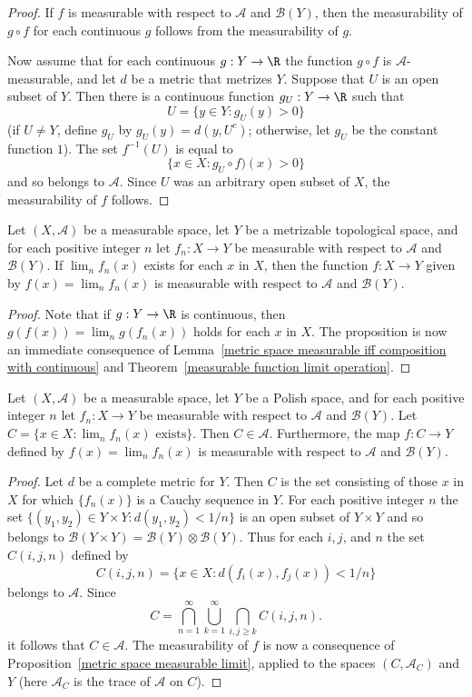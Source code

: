 \begin{proof}
If $f$ is measurable with respect to $\mathcal{A}$ and $\mathcal{B}(Y)$, then the measurability of $g\circ f$ for each continuous $g$ follows from the measurability of $g$.\par
Now assume that for each continuous $g:Y\to\R$ the function $g\circ f$ is $\mathcal{A}$-measurable, and let $d$ be a metric that metrizes $Y$. Suppose that $U$ is an open subset of $Y$. Then there is a continuous function $g_U:Y\to\R$ such that
\[U=\{y\in Y:g_U(y)>0\}\]
(if $U\neq Y$, define $g_U$ by $g_U(y)=d(y,U^c)$; otherwise, let $g_U$ be the constant function $1$). The set $f^{-1}(U)$ is equal to
\[\{x\in X:g_U\circ f)(x)>0\}\]
and so belongs to $\mathcal{A}$. Since $U$ was an arbitrary open subset of $X$, the measurability of $f$ follows.
\end{proof}
\begin{proposition}\label{metric space measurable limit}
Let $(X,\mathcal{A})$ be a measurable space, let $Y$ be a metrizable topological space, and for each positive integer $n$ let $f_n:X\to Y$ be measurable with respect to $\mathcal{A}$ and $\mathcal{B}(Y)$. If $\lim_nf_n(x)$ exists for each $x$ in $X$, then the function $f:X\to Y$ given by $f(x)=\lim_nf_n(x)$ is measurable with respect to $\mathcal{A}$ and $\mathcal{B}(Y)$.
\end{proposition}
\begin{proof}
Note that if $g:Y\to\R$ is continuous, then $g(f(x))=\lim_ng(f_n(x))$ holds for each $x$ in $X$. The proposition is now an immediate consequence of Lemma~\ref{metric space measurable iff composition with continuous} and Theorem~\ref{measurable function limit operation}.
\end{proof}
\begin{proposition}
Let $(X,\mathcal{A})$ be a measurable space, let $Y$ be a Polish space, and for each positive integer $n$ let $f_n:X\to Y$ be measurable with respect to $\mathcal{A}$ and $\mathcal{B}(Y)$. Let $C=\{x\in X:\lim_nf_n(x)\text{ exists}\}$. Then $C\in\mathcal{A}$. Furthermore, the map $f:C\to Y$ defined by $f(x)=\lim_nf_n(x)$ is measurable with respect to $\mathcal{A}$ and $\mathcal{B}(Y)$.
\end{proposition}
\begin{proof}
Let $d$ be a complete metric for $Y$. Then $C$ is the set consisting of those $x$ in $X$ for which $\{f_n(x)\}$ is a Cauchy sequence in $Y$. For each positive integer $n$ the set $\{(y_1,y_2)\in Y\times Y:d(y_1,y_2)<1/n\}$ is an open subset of $Y\times Y$ and so belongs to $\mathcal{B}(Y\times Y)=\mathcal{B}(Y)\otimes\mathcal{B}(Y)$. Thus for each $i,j$, and $n$ the set $C(i,j,n)$ defined by
\[C(i,j,n)=\{x\in X:d(f_i(x),f_j(x))<1/n\}\]
belongs to $\mathcal{A}$. Since
\[C=\bigcap_{n=1}^{\infty}\bigcup_{k=1}^{\infty}\bigcap_{i,j\geq k}C(i,j,n).\]
it follows that $C\in\mathcal{A}$. The measurability of $f$ is now a consequence of Proposition~\ref{metric space measurable limit}, applied to the spaces $(C,\mathcal{A}_C)$ and $Y$ (here $\mathcal{A}_C$ is the trace of $\mathcal{A}$ on $C$).
\end{proof}
